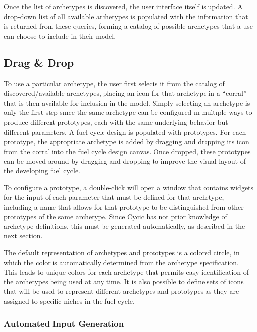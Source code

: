 Once the list of archetypes is discovered, the user interface itself is
updated.  A drop-down list of all available archetypes is populated with the
information that is returned from these queries, forming a catalog of possible
archetypes that a use can choose to include in their model.

\subsection{Drag \& Drop}

To use a particular archetype, the user first selects it from the catalog of
discovered/available archetypes, placing an icon for that archetype in a
``corral'' that is then available for inclusion in the model.  Simply
selecting an archetype is only the first step since the same archetype can be
configured in multiple ways to produce different prototypes, each with the
same underlying behavior but different parameters.  A fuel cycle design is
populated with prototypes. For each prototype, the appropriate archetype is
added by dragging and dropping its icon from the corral into the fuel cycle
design canvas.  Once dropped, these prototypes can be moved around by dragging
and dropping to improve the visual layout of the developing fuel cycle.

To configure a prototype, a double-click will open a window that contains
widgets for the input of each parameter that must be defined for that
archetype, including a name that allows for that prototype to be distinguished
from other prototypes of the same archetype.  Since Cycic has not prior
knowledge of archetype definitions, this must be generated automatically, as
described in the next section.

The default representation of archetypes and prototypes is a colored circle,
in which the color is automatically determined from the archetype
specification.  This leads to unique colors for each archetype that permits
easy identification of the archetypes being used at any time.  It is also
possible to define sets of icons that will be used to represent different
archetypes and prototypes as they are assigned to specific niches in the fuel
cycle.

\subsubsection{Automated Input Generation}

